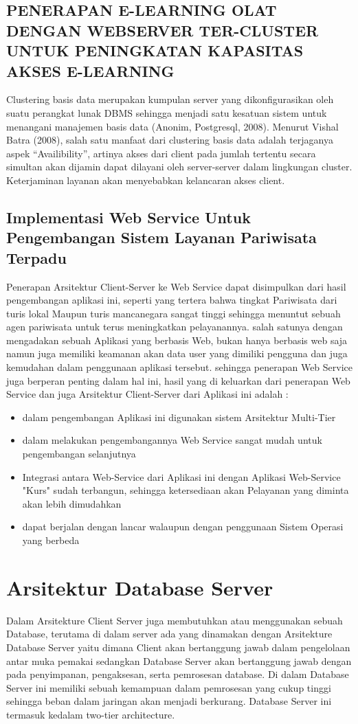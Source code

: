 {\subsection {PENERAPAN E-LEARNING OLAT DENGAN WEBSERVER TER-CLUSTER UNTUK PENINGKATAN KAPASITAS AKSES E-LEARNING} 
Clustering basis data merupakan kumpulan server yang dikonfigurasikan oleh suatu perangkat lunak DBMS sehingga menjadi satu kesatuan sistem 
untuk menangani manajemen basis data (Anonim, Postgresql, 2008). Menurut Vishal Batra (2008), salah satu manfaat dari clustering basis data 
adalah terjaganya aspek “Availibility”, artinya akses dari client pada jumlah tertentu secara simultan akan dijamin dapat dilayani oleh 
server-server dalam lingkungan cluster. Keterjaminan layanan akan menyebabkan kelancaran akses client.

\subsection {Implementasi Web Service Untuk Pengembangan Sistem Layanan Pariwisata Terpadu}
Penerapan Arsitektur Client-Server ke Web Service dapat disimpulkan dari hasil pengembangan aplikasi ini, seperti yang tertera bahwa tingkat Pariwisata
dari turis lokal Maupun turis mancanegara sangat tinggi sehingga menuntut sebuah agen pariwisata untuk terus meningkatkan pelayanannya. salah satunya dengan
mengadakan sebuah Aplikasi yang berbasis Web, bukan hanya berbasis web saja namun juga memiliki keamanan akan data user yang dimiliki pengguna dan juga kemudahan
dalam penggunaan aplikasi tersebut. sehingga penerapan Web Service juga berperan penting dalam hal ini, hasil yang di keluarkan dari penerapan Web Service dan juga
Arsitektur Client-Server dari Aplikasi ini adalah :

\begin{itemize}
    \item dalam pengembangan Aplikasi ini digunakan sistem Arsitektur Multi-Tier
    \item dalam melakukan pengembangannya Web Service sangat mudah untuk pengembangan selanjutnya
    \item Integrasi antara Web-Service dari Aplikasi ini dengan Aplikasi Web-Service "Kurs" sudah terbangun, sehingga ketersediaan akan Pelayanan yang
    diminta akan lebih dimudahkan
    \item dapat berjalan dengan lancar walaupun dengan penggunaan Sistem Operasi yang berbeda
\end{itemize}

\section{Arsitektur Database Server}
Dalam Arsitekture Client Server juga membutuhkan atau menggunakan sebuah Database, terutama di dalam server ada yang
dinamakan dengan Arsitekture Database Server yaitu dimana Client akan bertanggung jawab dalam pengelolaan antar muka pemakai
sedangkan Database Server akan bertanggung jawab dengan pada penyimpanan, pengaksesan, serta pemrosesan database.
Di dalam Database Server ini memiliki sebuah kemampuan dalam pemrosesan yang cukup tinggi sehingga beban dalam jaringan akan 
menjadi berkurang. Database Server ini termasuk kedalam two-tier architecture.

}
